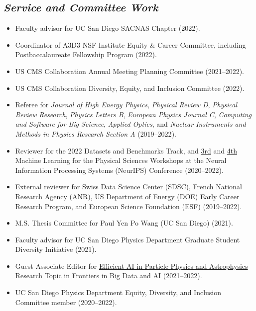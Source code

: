\documentclass[11pt]{res}
\newcommand{\MarginText}[1]{\section{\textit{#1}}}
\begin{document}
\begin{resume}

  \MarginText{Service and Committee Work}

  \begin{itemize}
    \itemsep-0.3em
    \item Faculty advisor for UC San Diego SACNAS Chapter ({2022}).
    \item Coordinator of A3D3 NSF Institute Equity \& Career Committee, including Postbaccalaureate Fellowship Program ({2022}).
    \item US CMS Collaboration Annual Meeting Planning Committee ({2021--2022}).
    \item US CMS Collaboration Diversity, Equity, and Inclusion Committee ({2022}).
    \item Referee for \emph{Journal of High Energy Physics}, \emph{Physical Review D}, \emph{Physical Review Research}, \emph{Physics Letters B}, \emph{European Physics Journal C}, \emph{Computing and Software for Big Science}, \emph{Applied Optics}, and \emph{Nuclear Instruments and Methods in Physics Research Section A} ({2019--2022}).
    \item Reviewer for the 2022 Datasets and Benchmarks Track, and \href{https://ml4physicalsciences.github.io/2020/}{3rd} and \href{https://ml4physicalsciences.github.io/2021/}{4th} Machine Learning for the Physical Sciences Workshops at the Neural Information Processing Systems (NeurIPS) Conference ({2020--2022}).
    \item External reviewer for Swiss Data Science Center (SDSC), French National Research Agency (ANR), US Department of Energy (DOE) Early Career Research Program, and European Science Foundation (ESF) ({2019--2022}).
    \item M.S. Thesis Committee for Paul Yen Po Wang (UC San Diego) ({2021}).
    \item Faculty advisor for UC San Diego Physics Department Graduate Student Diversity Initiative ({2021}).
    \item Guest Associate Editor for \href{https://www.frontiersin.org/research-topics/19095/efficient-ai-in-particle-physics-and-astrophysics}{Efficient AI in Particle Physics and Astrophysics} Research Topic in Frontiers in Big Data and AI ({2021--2022}).
    \item UC San Diego Physics Department Equity, Diversity, and Inclusion Committee member ({2020--2022}).

\end{itemize}
\end{resume}
\end{document}

